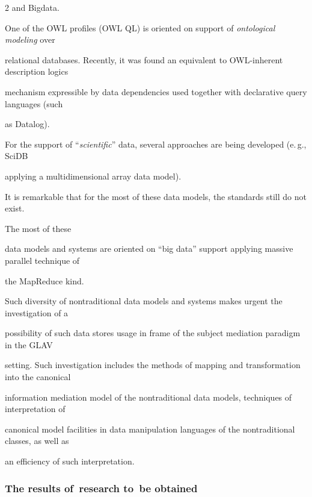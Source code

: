 \begin{multicols}{2}
and Bigdata.





One of the OWL profiles (OWL QL) is oriented on support of \textit{ontological modeling} over 


relational databases. Recently, it was found an equivalent to OWL-inherent description logics 


mechanism expressible by data dependencies used together with declarative query languages (such 


as Datalog). 





For the support of ``\textit{scientific}'' data, several approaches are being developed (e.\,g., SciDB 


applying a multidimensional array data model). 





It is remarkable that for the most of these data models, the standards still do not exist. 


The most of these 


data models and systems are oriented on ``big data'' support applying massive parallel technique of 


the MapReduce kind.





Such diversity of nontraditional data models and systems makes urgent the investigation of a 


possibility of such data stores usage in frame of the subject mediation paradigm in the GLAV 


setting. Such investigation includes the methods of mapping and transformation into the canonical 


information mediation model of the nontraditional data models, techniques of interpretation of 


canonical model facilities in data manipulation languages of the nontraditional classes, as well as 


an efficiency of such interpretation.





\subsubsection{The results of~research to~be obtained}






\end{multicols}
